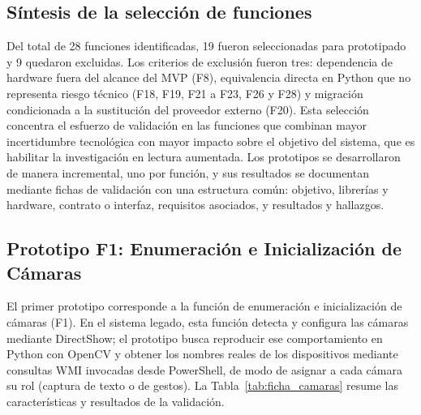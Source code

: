 \subsection{Síntesis de la selección de funciones}
 
Del total de 28 funciones identificadas, 19 fueron seleccionadas para prototipado y 9 quedaron excluidas. Los criterios de exclusión fueron tres: dependencia de hardware fuera del alcance del MVP (F8), equivalencia directa en Python que no representa riesgo técnico (F18, F19, F21 a F23, F26 y F28) y migración condicionada a la sustitución del proveedor externo (F20). Esta selección concentra el esfuerzo de validación en las funciones que combinan mayor incertidumbre tecnológica con mayor impacto sobre el objetivo del sistema, que es habilitar la investigación en lectura aumentada. Los prototipos se desarrollaron de manera incremental, uno por función, y sus resultados se documentan mediante fichas de validación con una estructura común: objetivo, librerías y hardware, contrato o interfaz, requisitos asociados, y resultados y hallazgos.
 
\subsection{Prototipo F1: Enumeración e Inicialización de Cámaras}
 
El primer prototipo corresponde a la función de enumeración e inicialización de cámaras (F1). En el sistema legado, esta función detecta y configura las cámaras mediante DirectShow; el prototipo busca reproducir ese comportamiento en Python con OpenCV y obtener los nombres reales de los dispositivos mediante consultas WMI invocadas desde PowerShell, de modo de asignar a cada cámara su rol (captura de texto o de gestos). La Tabla~\ref{tab:ficha_camaras} resume las características y resultados de la validación.
 
